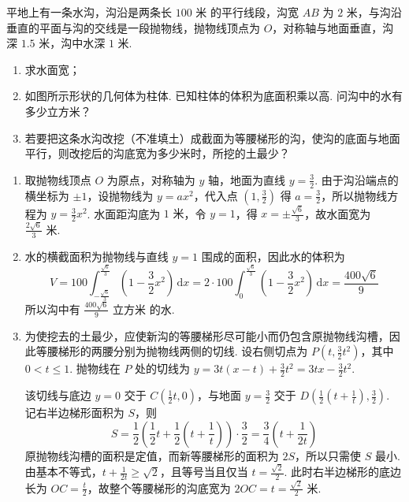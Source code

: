 \begin{problem}
平地上有一条水沟，沟沿是两条长 \(100\text{ 米}\) 的平行线段，沟宽 \(AB\) 为 \(2\text{ 米}\)，与沟沿垂直的平面与沟的交线是一段抛物线，抛物线顶点为 \(O\)，对称轴与地面垂直，沟深 \(1.5\text{ 米}\)，沟中水深 \(1\text{ 米}\).

\begin{enumerate}
\item 求水面宽；
\item 如图所示形状的几何体为柱体. 已知柱体的体积为底面积乘以高. 问沟中的水有多少立方米？
\item 若要把这条水沟改挖（不准填土）成截面为等腰梯形的沟，使沟的底面与地面平行，则改挖后的沟底宽为多少米时，所挖的土最少？
\end{enumerate}

\end{problem}

\begin{solution}
\begin{enumerate}
\item 取抛物线顶点 \(O\) 为原点，对称轴为 \(y\) 轴，地面为直线 \(y=\frac32\). 由于沟沿端点的横坐标为 \(\pm1\)，设抛物线为 \(y=ax^2\)，代入点 \(\left(1,\frac32\right)\) 得 \(a=\frac32\)，所以抛物线方程为 \(y=\frac32x^2\). 水面距沟底为 \(1\text{ 米}\)，令 \(y=1\)，得 \(x=\pm\frac{\sqrt6}{3}\)，故水面宽为 \(\frac{2\sqrt6}{3}\text{ 米}\).

\item 水的横截面积为抛物线与直线 \(y=1\) 围成的面积，因此水的体积为
\[
V=100\int_{-\frac{\sqrt6}{3}}^{\frac{\sqrt6}{3}}\left(1-\frac32x^2\right)\,\mathrm dx=2\cdot100\int_0^{\frac{\sqrt6}{3}}\left(1-\frac32x^2\right)\,\mathrm dx=\frac{400\sqrt6}{9}
\]
所以沟中有 \(\frac{400\sqrt6}{9}\text{ 立方米}\) 的水.

\item 为使挖去的土最少，应使新沟的等腰梯形尽可能小而仍包含原抛物线沟槽，因此等腰梯形的两腰分别为抛物线两侧的切线. 设右侧切点为 \(P\left(t,\frac32t^2\right)\)，其中 \(0<t\leq1\). 抛物线在 \(P\) 处的切线为
\(y=3t(x-t)+\frac32t^2=3tx-\frac32t^2\).

该切线与底边 \(y=0\) 交于 \(C\left(\frac12t,0\right)\)，与地面 \(y=\frac32\) 交于 \(D\left(\frac12\left(t+\frac1t\right),\frac32\right)\). 记右半边梯形面积为 \(S\)，则
\[
S=\frac12\left(\frac12t+\frac12\left(t+\frac1t\right)\right)\cdot\frac32=\frac34\left(t+\frac1{2t}\right)
\]
原抛物线沟槽的面积是定值，而新等腰梯形的面积为 \(2S\)，所以只需使 \(S\) 最小. 由基本不等式，\(t+\frac1{2t}\geq\sqrt2\)，且等号当且仅当 \(t=\frac{\sqrt2}{2}\). 此时右半边梯形的底边长为 \(OC=\frac{t}{2}\)，故整个等腰梯形的沟底宽为 \(2OC=t=\frac{\sqrt2}{2}\text{ 米}\).
\end{enumerate}
\end{solution}

